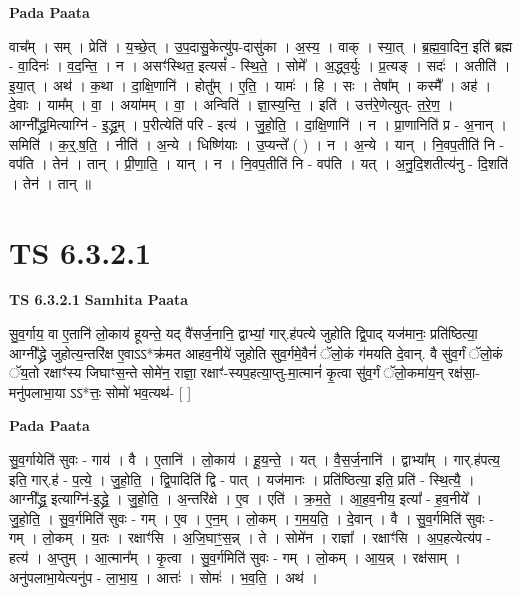 \documentclass[17pt]{extarticle}
\begin{document}
\textbf{Pada Paata} \newline

वाच᳚म् । सम् । प्रेति॑ । य॒च्छे॒त् । उ॒प॒दासु॒केत्यु॑प-दासु॑का । अ॒स्य॒ । वाक् । स्या॒त् । ब्र॒ह्म॒वा॒दिन॒ इति॑ ब्रह्म - वा॒दिनः॑ । व॒द॒न्ति॒ । न । असꣳ॑स्थित॒ इत्यसं᳚ - स्थि॒ते॒ । सोमे᳚ । अ॒द्ध्व॒र्युः । प्र॒त्यङ् । सदः॑ । अतीति॑ । इ॒या॒त् । अथ॑ । क॒था । दा॒क्षि॒णानि॑ । होतु᳚म् । ए॒ति॒ । यामः॑ । हि । सः । तेषा᳚म् । कस्मै᳚ । अह॑ । दे॒वाः । याम᳚म् । वा॒ । अया॑मम् । वा॒ । अन्विति॑ । ज्ञा॒स्य॒न्ति॒ । इति॑ । उत्त॑रे॒णेत्युत्- त॒रे॒ण॒ । आग्नी᳚द्ध्र॒मित्याग्नि॑ - इ॒द्ध्र॒म् । प॒रीत्येति॑ परि - इत्य॑ । जु॒हो॒ति॒ । दा॒क्षि॒णानि॑ । न । प्रा॒णानिति॑ प्र - अ॒नान् । समिति॑ । क॒र्॒.ष॒ति॒ । नीति॑ । अ॒न्ये । धिष्णि॑याः । उ॒प्यन्ते᳚ ( ) । न । अ॒न्ये । यान् । नि॒वप॒तीति॑ नि - वप॑ति । तेन॑ । तान् । प्री॒णा॒ति॒ । यान् । न । नि॒वप॒तीति॑ नि - वप॑ति । यत् । अ॒नु॒दि॒शतीत्य॑नु - दि॒शति॑ । तेन॑ । तान् ॥  \newline





\section{ TS 6.3.2.1 }

\textbf{TS 6.3.2.1 } \newline
\textbf{Samhita Paata} \newline

सु॒व॒र्गाय॒ वा ए॒तानि॑ लो॒काय॑ हूयन्ते॒ यद् वै॑सर्ज॒नानि॒ द्वाभ्यां॒ गार्.ह॑पत्ये जुहोति द्वि॒पाद् यज॑मानः॒ प्रति॑ष्ठित्या॒ आग्नी᳚द्ध्रे जुहोत्य॒न्तरि॑क्ष ए॒वाऽऽ*क्र॑मत आहव॒नीये॑ जुहोति सुव॒र्गमे॒वैनं॑ ॅलो॒कं ग॑मयति दे॒वान्. वै सु॑व॒र्गं ॅलो॒कं ॅय॒तो रक्षाꣳ॑स्य जिघाꣳस॒न्ते सोमे॑न॒ राज्ञा॒ रक्षाꣳ॑-स्यप॒हत्या॒प्तु-मा॒त्मानं॑ कृ॒त्वा सु॑व॒र्गं ॅलो॒कमा॑य॒न् रक्ष॑सा॒-मनु॑पलाभा॒या ऽऽ*त्तः॒ सोमो॑ भव॒त्यथ॑- [  ] \newline

\textbf{Pada Paata} \newline

सु॒व॒र्गायेति॑ सुवः - गाय॑ । वै । ए॒तानि॑ । लो॒काय॑ । हू॒य॒न्ते॒ । यत् । वै॒स॒र्ज॒नानि॑ । द्वाभ्या᳚म् । गार्.ह॑पत्य॒ इति॒ गार्.ह॑ - प॒त्ये॒ । जु॒हो॒ति॒ । द्वि॒पादिति॑ द्वि - पात् । यज॑मानः । प्रति॑ष्ठित्या॒ इति॒ प्रति॑ - स्थि॒त्यै॒ । आग्नी᳚द्ध्र॒ इत्याग्नि॑-इ॒द्ध्रे॒ । जु॒हो॒ति॒ । अ॒न्तरि॑क्षे । ए॒व । एति॑ । क्र॒म॒ते॒ । आ॒ह॒व॒नीय॒ इत्या᳚ - ह॒व॒नीये᳚ । जु॒हो॒ति॒ । सु॒व॒र्गमिति॑ सुवः - गम् । ए॒व । ए॒न॒म् । लो॒कम् । ग॒म॒य॒ति॒ । दे॒वान् । वै । सु॒व॒र्गमिति॑ सुवः - गम् । लो॒कम् । य॒तः । रक्षाꣳ॑सि । अ॒जि॒घाꣳ॒॒स॒न्न् । ते । सोमे॑न । राज्ञा᳚ । रक्षाꣳ॑सि । अ॒प॒हत्येत्य॑प - हत्य॑ । अ॒प्तुम् । आ॒त्मान᳚म् । कृ॒त्वा । सु॒व॒र्गमिति॑ सुवः - गम् । लो॒कम् । आ॒य॒न्न् । रक्ष॑साम् । अनु॑पलाभा॒येत्यनु॑प - ला॒भा॒य॒ । आत्तः॑ । सोमः॑ । भ॒व॒ति॒ । अथ॑ ।  \newline
\end{document}

